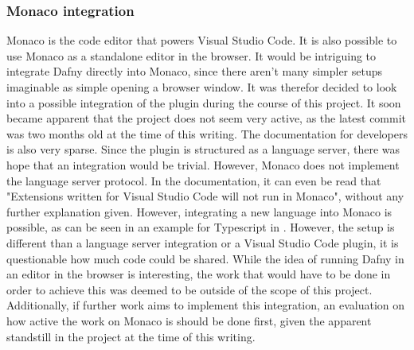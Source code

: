 \subsubsection{Monaco integration}
Monaco\cite{monaco} is the code editor that powers Visual Studio Code. It is also possible to use Monaco as a standalone editor in the browser. It would be intriguing to integrate Dafny directly into Monaco, since there aren't many simpler setups imaginable as simple opening a browser window. It was therefor decided to look into a possible integration of the plugin during the course of this project. \newline
 It soon became apparent that the project does not seem very active, as the latest commit was two months old at the time of this writing. The documentation for developers is also very sparse. Since the plugin is structured as a language server, there was hope that an integration would be trivial. However, Monaco does not implement the language server protocol. In the documentation, it can even be read that "Extensions written for Visual Studio Code will not run in Monaco"\cite{monaco}, without any further explanation given. \newline
 However, integrating a new language into Monaco is possible, as can be seen in an example for Typescript in  \cite{monacoType}. However, the setup is different than a language server integration or a Visual Studio Code plugin, it is questionable how much code could be shared. While the idea of running Dafny in an editor in the browser is interesting, the work that would have to be done in order to achieve this was deemed to be outside of the scope of this project. Additionally, if further work aims to implement this integration, an evaluation on how active the work on Monaco is should be done first, given the apparent standstill in the project at the time of this writing.